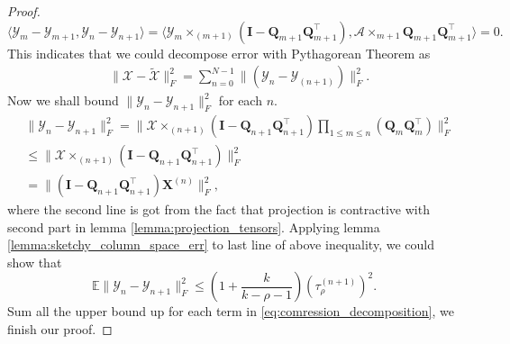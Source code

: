 \begin{lem}
\begin{proof}
\begin{equation}
\langle\mathscr{Y}_m-\mathscr{Y}_{m+1},  \mathscr{Y}_n - \mathscr{Y}_{n+1}\rangle = \langle\mathscr{Y}_{m} \times_{(m+1)} (\mathbf{I} - \mathbf{Q}_{m+1}\mathbf{Q}^\top_{m+1}), \mathscr{A} \times_{m+1} \mathbf{Q}_{m+1}\mathbf{Q}^\top_{m+1} \rangle = 0.
\end{equation}
This indicates that we could decompose error with Pythagorean Theorem as 
\begin{equation}
\label{eq:comression_decomposition}
\begin{aligned}
& \|\mathscr{X}-\tilde{\mathscr{X}}\|_F^2 =  \sum_{n=0}^{N-1} \| (\mathscr{Y}_n - \mathscr{Y}_{(n+1)})\|_F^2.
\end{aligned}
\end{equation}
Now we shall bound $\|\mathscr{Y}_n - \mathscr{Y}_{n+1}\|_F^2$ for each $n$. 
\begin{equation}
\begin{aligned}
&\|\mathscr{Y}_n - \mathscr{Y}_{n+1}\|_F^2 = \|\mathscr{X}\times_{(n+1)} (\mathbf{I} - \mathbf{Q}_{n+1}\mathbf{Q}_{n+1}^\top)\prod_{1\le m\le n}(\mathbf{Q}_{m}\mathbf{Q}_{m}^\top)\|_F^2 \\
&\le \|\mathscr{X}\times_{(n+1)} (\mathbf{I} - \mathbf{Q}_{n+1}\mathbf{Q}_{n+1}^\top)\|_F^2 \\
&= \| (\mathbf{I} - \mathbf{Q}_{n+1}\mathbf{Q}_{n+1}^\top)\mathbf{X}^{(n)}\|_F^2,
\end{aligned}
\end{equation}
where the second line is got from the fact that projection is contractive with second part in lemma \ref{lemma:projection_tensors}. 
Applying lemma \ref{lemma:sketchy_column_space_err} to last line of above inequality, we could show that 
\begin{equation}
\mathbb{E} \|\mathscr{Y}_n - \mathscr{Y}_{n+1}\|_F^2 \le \left(1+\frac{k}{k-\rho-1}\right)(\tau^{(n+1)}_\rho)^2.
\end{equation}
Sum all the upper bound up for each term in  \eqref{eq:comression_decomposition}, we finish our proof. 
\end{proof}
\end{lem}